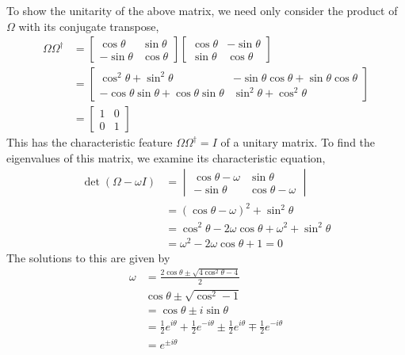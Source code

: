 \documentclass[../principles-of-quantum-mechanics.tex]{subfiles}
\begin{document}
\begin{questions}
\begin{solution}
	To show the unitarity of the above matrix, we need only consider the product of $\Omega$ with its conjugate transpose,
	\begin{align*}
		\Omega\Omega^\dagger &= \begin{bmatrix}\cos\theta & \sin\theta \\ -\sin\theta & \cos\theta\end{bmatrix}\begin{bmatrix}\cos\theta & -\sin\theta \\ \sin\theta & \cos\theta\end{bmatrix} \\
		&= \begin{bmatrix}\cos^2\theta + \sin^2\theta & -\sin\theta\cos\theta + \sin\theta\cos\theta \\ -\cos\theta\sin\theta + \cos\theta\sin\theta & \sin^2\theta + \cos^2\theta\end{bmatrix} \\
		&= \begin{bmatrix}1 & 0 \\ 0 & 1\end{bmatrix}
	\end{align*}
	This has the characteristic feature $\Omega\Omega^\dagger = I$ of a unitary matrix. To find the eigenvalues of this matrix, we examine its characteristic equation,
	\begin{align*}
		\det(\Omega - \omega{I}) &= \begin{vmatrix}\cos\theta - \omega & \sin\theta \\ -\sin\theta & \cos\theta - \omega\end{vmatrix} \\
		&= (\cos\theta - \omega)^2 + \sin^2\theta \\
		&= \cos^2\theta - 2\omega\cos\theta + \omega^2 + \sin^2\theta \\
		&= \omega^2 - 2\omega\cos\theta + 1 = 0
	\end{align*}
	The solutions to this are given by
	\begin{align*}
		\omega &= \frac{2\cos\theta \pm \sqrt{4\cos^2\theta - 4}}{2} \\
		& \cos\theta \pm \sqrt{\cos^2 - 1} \\
		&= \cos\theta \pm i\sin\theta \\
		&= \frac{1}{2}e^{i\theta} + \frac{1}{2}e^{-i\theta} \pm \frac{1}{2}e^{i\theta} \mp \frac{1}{2}e^{-i\theta} \\
		&= e^{\pm{i}\theta}

\end{align*}
\end{solution}
\end{questions}
\end{document}
